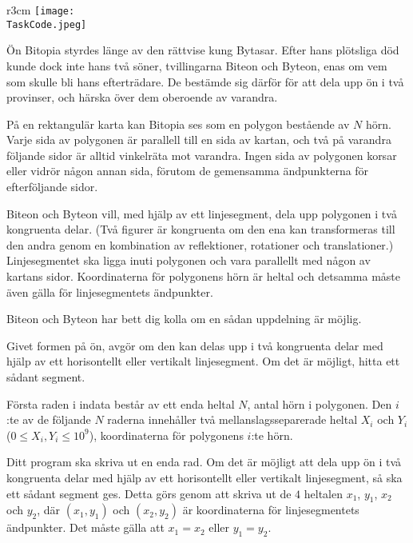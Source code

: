 \documentclass{boi2014-se}
\renewcommand{\TaskCode}{demarcation}
\begin{document}
    \begin{wrapfigure}{r}{3cm}
        \vspace{-24pt}
		\texttt{[image: \\TaskCode.jpeg]}
	\end{wrapfigure}

    Ön Bitopia styrdes länge av den rättvise kung Bytasar.
    Efter hans plötsliga död kunde dock inte hans två söner,
    tvillingarna Biteon och Byteon, enas om vem som skulle bli hans efterträdare.
    De bestämde sig därför för att dela upp ön i två provinser, och
    härska över dem oberoende av varandra.

    På en rektangulär karta kan Bitopia ses som en polygon bestående av $N$ hörn.
    Varje sida av polygonen är parallell till en sida av kartan, och
    två på varandra följande sidor är alltid vinkelräta mot varandra.
    Ingen sida av polygonen korsar eller vidrör någon annan sida, förutom
    de gemensamma ändpunkterna för efterföljande sidor.

    Biteon och Byteon vill, med hjälp av ett linjesegment, dela upp polygonen i
    två kongruenta delar. (Två figurer är kongruenta om den ena kan transformeras till
    den andra genom en kombination av reflektioner, rotationer och translationer.)
    Linjesegmentet ska ligga inuti polygonen och vara
    parallellt med någon av kartans sidor. Koordinaterna för polygonens hörn är heltal och
    detsamma måste även gälla för linjesegmentets ändpunkter.
 
    Biteon och Byteon har bett dig kolla om en sådan uppdelning är möjlig.
 
    \Task

    Givet formen på ön, avgör om den kan delas upp i två kongruenta delar
    med hjälp av ett horisontellt eller vertikalt linjesegment. Om det är
    möjligt, hitta ett sådant segment.

    \Input
    Första raden i indata består av ett enda heltal $N$, antal hörn i polygonen.
    Den $i$:te av de följande $N$ raderna innehåller två mellanslagsseparerade heltal
    $X_i$ och $Y_i$ ($0 \le X_i, Y_i \le 10^9$), koordinaterna för polygonens $i$:te hörn.

    \Output
    Ditt program ska skriva ut en enda rad. Om det är möjligt att dela upp ön i
    två kongruenta delar med hjälp av ett horisontellt eller vertikalt linjesegment,
    så ska ett sådant segment ges. Detta görs genom att skriva ut de $4$ heltalen 
    $x_1$, $y_1$, $x_2$ och $y_2$, där $(x_1, y_1)$ och $(x_2, y_2)$ är koordinaterna
    för linjesegmentets ändpunkter. Det måste gälla att $x_1 = x_2$ eller $y_1 = y_2$.
\end{document}
